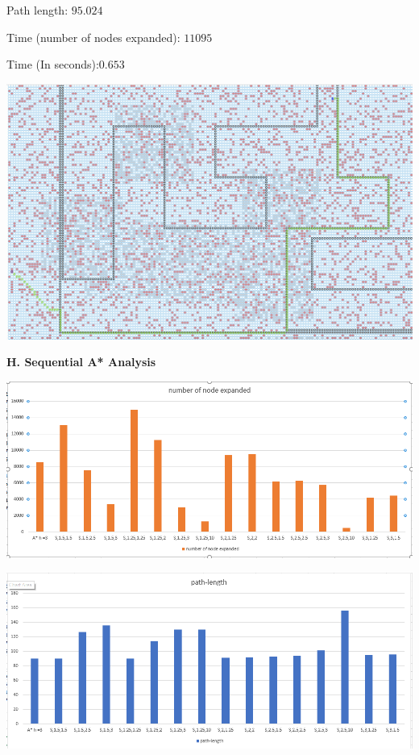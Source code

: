 \documentclass[12pt, letterpaper]{article}
\begin{document}
Path length: $ 95.024 $

Time (number of nodes expanded): $ 11095 $

Time (In seconds):$ 0.653 $

\noindent \includegraphics[scale=0.2]{"g-sns-map3-1"}

\medskip
\pagebreak %

\noindent \textbf{H. Sequential A* Analysis}

\noindent \includegraphics[scale=0.6]{"s-nodeexpanded"}

\medskip

\noindent \includegraphics[scale=0.6]{"s-pathlength"}
\end{document}
